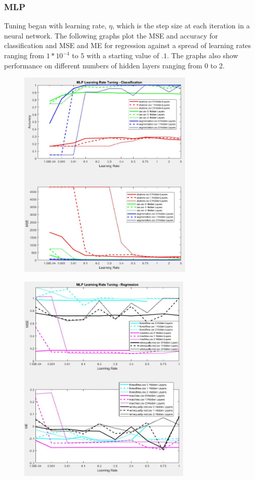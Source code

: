 \documentclass[twoside,11pt]{article}
\begin{document}
\subsubsection{MLP}
Tuning began with learning rate, $\eta$, which is the step size at each iteration in a neural network. The following graphs plot the MSE and accuracy for classification and MSE and ME for regression against a spread of learning rates ranging from $1*10^{-4}$ to $5$ with a starting value of $.1$. The graphs also show performance on different numbers of hidden layers ranging from 0 to 2. \\

\begin{figure}[h]
	\centering
	\includegraphics[height=4in]{FINAL_FIGS/MLP_LR_TUNING_CLASS.JPG}
\end{figure}
\begin{figure}[h]
	\centering
	\includegraphics[height=4in]{FINAL_FIGS/MLP_LR_TUNING_REG.JPG}
\end{figure}
\end{document}
